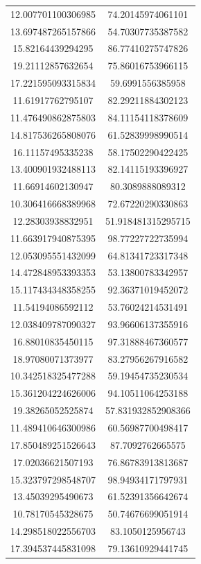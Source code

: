 \begin{table}
\begin{tabular}{cc}
12.007701100306985 & 74.20145974061101 \\
13.697487265157866 & 54.70307735387582 \\
15.82164439294295 & 86.77410275747826 \\
19.21112857632654 & 75.86016753966115 \\
17.221595093315834 & 59.6991556385958 \\
11.61917762795107 & 82.29211884302123 \\
11.476490862875803 & 84.11154118378609 \\
14.817536265808076 & 61.52839998990514 \\
16.11157495335238 & 58.17502290422425 \\
13.400901932488113 & 82.14115193396927 \\
11.66914602130947 & 80.3089888089312 \\
10.306416668389968 & 72.67220290330863 \\
12.28303938832951 & 51.918481315295715 \\
11.663917940875395 & 98.77227722735994 \\
12.053095551432099 & 64.81341723317348 \\
14.472848953393353 & 53.13800783342957 \\
15.117434348358255 & 92.36371019452072 \\
11.54194086592112 & 53.76024214531491 \\
12.038409787090327 & 93.96606137355916 \\
16.88010835450115 & 97.31888467360577 \\
18.97080071373977 & 83.27956267916582 \\
10.342518325477288 & 59.19454735230534 \\
15.361204224626006 & 94.10511064253188 \\
19.38265052525874 & 57.831932852908366 \\
11.489410646300986 & 60.56987700498417 \\
17.850489251526643 & 87.7092762665575 \\
17.02036621507193 & 76.86783913813687 \\
15.323797298548707 & 98.94934171797931 \\
13.45039295490673 & 61.52391356642674 \\
10.78170545328675 & 50.74676699051914 \\
14.298518022556703 & 83.1050125956743 \\
17.394537445831098 & 79.13610929441745 \\

\end{tabular}
\end{table}
